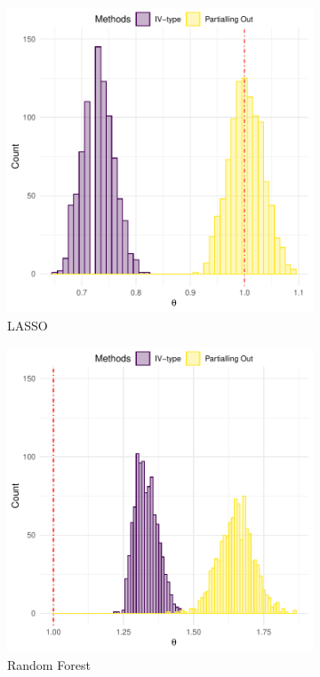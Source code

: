 \documentclass[en,mtpro2]{elegantpaper}
\begin{document}
\begin{figure}[htpb]
    \centering
    \begin{subfigure}{.45\textwidth}
        \centering
        \includegraphics[width=\linewidth]{figures/iv-type-vs-partialling-out-lasso.pdf}
        \caption{LASSO}
    \end{subfigure}
    \begin{subfigure}{.45\textwidth}
        \centering
        \includegraphics[width=\linewidth]{figures/iv-type-vs-partialling-out-rf.pdf}
        \caption{Random Forest}
    \end{subfigure}
    \caption{}
\end{figure}
\end{document}
